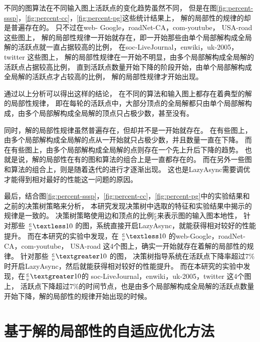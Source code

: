 不同的图算法在不同输入图上活跃点的变化趋势虽然不同，
但是在图\ref{fig:percent-sssp}，\ref{fig:percent-cc}，\ref{fig:percent-pg}这些统计结果上，
解的局部性的规律的却是普遍存在的。
只不过在web- Google，roadNet-CA，com-youtube， USA-road 这些图上，
解的局部性规律一开始就存在，即一开始那些由单个局部解构成全局解的活跃点就一直占据较高的比例，
在soc-LiveJournal，enwiki，uk-2005，twitter 这些图上，
解的局部性规律在一开始不明显，由多个局部解构成全局解的活跃点占据较高比例，
直到活跃点数量开始下降的阶段开始，由单个局部解构成全局解的活跃点才占较高的比例，
解的局部性规律才开始出现。


通过以上分析可以得出这样的结论，
在不同的算法和输入图上都存在着典型的解的局部性规律，
即在每轮的活跃点中，大部分顶点的全局解都只由单个局部解构成，由多个局部解构成全局解的顶点只占极少数，甚至没有。

同时，解的局部性规律虽然普遍存在，但却并不是一开始就存在。
在有些图上，由多个局部解构成全局解的点从一开始就只占极少数，并且数量一直在下降。
而在有些图上，由多个局部解构成全局解的点则存在一个先上升后下降的趋势。
也就是说，解的局部性在有的图和算法的组合上是一直都存在的。
而在另外一些图和算法的组合上，则是随着迭代的进行才逐渐出现。
这也是LazyAsync需要调优才能得到相对最好的性能这一问题的原因。


最后，结合图\ref{fig:percent-sssp}，\ref{fig:percent-cc}，\ref{fig:percent-pg}中的实验结果和之前的决策树策略来分析，
本研究发现决策树中选取的特征和实验结果中揭示的规律是一致的。
决策树策略使用边和顶点的比例$\frac{e}{v}$来表示图的输入图本地性，
针对那些 $\frac{e}{v} \textless 10$  的图，系统直接开启LazyAsync，就能获得相对较好的性能提升。
而在本研究的实验中发现，在 $\frac{e}{v} \textless 10$ 的web-Google，roadNet-CA，com-youtube，
USA-road 这4个图上，确实一开始就存在着解的局部性的规律。
针对那些 $\frac{e}{v} \textgreater 10$ 的图， 决策树指导系统在活跃点下降率超过7\%时开启LazyAsync，然后就能获得相对较好的性能提升。
而在本研究的实验中发现，在$\frac{e}{v} \textgreater 10$的 soc-LiveJournal，enwiki，uk-2005，twitter 这4个图上，
活跃点下降超过7\%的时间节点，也是由多个局部解构成全局解的活跃点数量开始下降，解的局部性的规律开始出现的时候。


\section{基于解的局部性的自适应优化方法}


